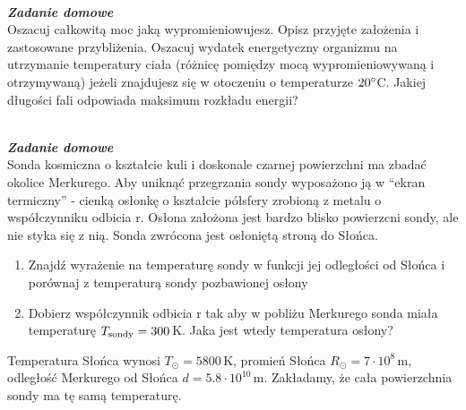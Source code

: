 \documentclass[11pt,a4paper]{article}
\newcounter{zaddom}\newcommand{\zaddom}[1][]{\addtocounter{zaddom}{1} ~\\  {\bf \emph{Zadanie domowe \arabic{zaddom} #1 }} \\}
\begin{document}
\zaddom
Oszacuj całkowitą moc jaką wypromieniowujesz. Opisz przyjęte założenia i zastosowane przybliżenia. Oszacuj
wydatek energetyczny organizmu na utrzymanie temperatury ciała (różnicę pomiędzy mocą wypromieniowywaną
i otrzymywaną) jeżeli znajdujesz się w otoczeniu o temperaturze $20\degree$C.
Jakiej długości fali odpowiada maksimum rozkładu energii?

\zaddom
Sonda kosmiczna o kształcie kuli i doskonale czarnej powierzchni ma zbadać okolice Merkurego. Aby uniknąć
przegrzania sondy wyposażono ją w “ekran termiczny” - cienką osłonkę o kształcie półsfery zrobioną z metalu
o współczynniku odbicia r. Osłona założona jest bardzo blisko powierzcni sondy, ale nie styka się z nią. Sonda
zwrócona jest osłoniętą stroną do Słońca.
\begin{enumerate}
\item Znajdź wyrażenie na temperaturę sondy w funkcji jej odległości od Słońca i porównaj z temperaturą sondy
pozbawionej osłony
\item Dobierz współczynnik odbicia r tak aby w pobliżu Merkurego sonda miała temperaturę $T_{\rm sondy}= 300$\,K. 
Jaka jest wtedy temperatura osłony?
\end{enumerate}
Temperatura Słońca wynosi $T_\odot= 5800$\,K, promień Słońca $R_\odot = 7 \cdot 10^8$\,m, 
odległość Merkurego od Słońca $d = 5.8 \cdot 10^{10}$\,m. 
Zakładamy, że cała powierzchnia sondy ma tę samą temperaturę.
\end{document}

